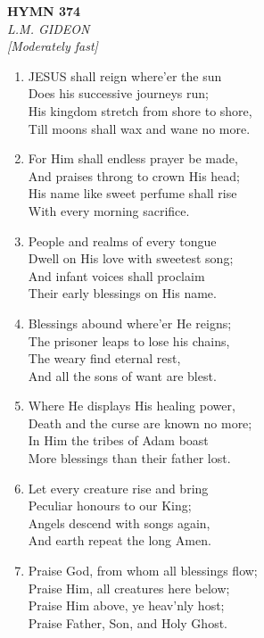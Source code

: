 \newpage
\begin{center}
    {\Large \textbf{HYMN 374}}
    \\
    \textit{L.M. GIDEON}
    \\
    \textit{\small [Moderately fast]}
\end{center}
\vspace{1em}

\begin{enumerate}
    \item JESUS shall reign where'er the sun \\
        Does his successive journeys run; \\
        His kingdom stretch from shore to shore, \\
        Till moons shall wax and wane no more.

    \item For Him shall endless prayer be made, \\
        And praises throng to crown His head; \\
        His name like sweet perfume shall rise \\
        With every morning sacrifice.

    \item People and realms of every tongue \\
        Dwell on His love with sweetest song; \\
        And infant voices shall proclaim \\
        Their early blessings on His name.

    \item Blessings abound where'er He reigns; \\
        The prisoner leaps to lose his chains, \\
        The weary find eternal rest, \\
        And all the sons of want are blest.

    \item Where He displays His healing power, \\
        Death and the curse are known no more; \\
        In Him the tribes of Adam boast \\
        More blessings than their father lost.

    \item Let every creature rise and bring \\
        Peculiar honours to our King; \\
        Angels descend with songs again, \\
        And earth repeat the long Amen.

    \item Praise God, from whom all blessings flow; \\
        Praise Him, all creatures here below; \\
        Praise Him above, ye heav'nly host; \\
        Praise Father, Son, and Holy Ghost.

\end{enumerate}

